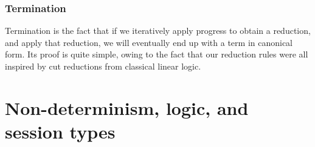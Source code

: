 \subsubsection{Termination}
Termination is the fact that if we iteratively apply progress to obtain a
reduction, and apply that reduction, we will eventually end up with a term in
canonical form.
Its proof is quite simple, owing to the fact that our reduction rules were all
inspired by cut reductions from classical linear logic.


\section{Non-determinism, logic, and session types}
